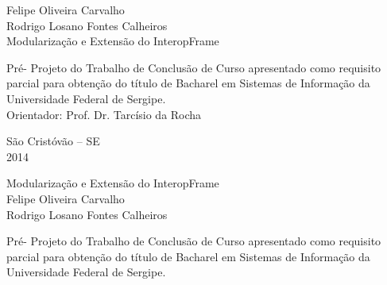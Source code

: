 \begin{titlepage}

\newpage
\thispagestyle{empty}
    \begin{center}
        {\Large Felipe Oliveira Carvalho \\ Rodrigo Losano Fontes Calheiros }\\[8.3cm]
        {\LARGE Modulariza\c{c}\~ao e Extens\~ao do InteropFrame} \\[4.3cm]
        \hspace{.45\textwidth} %
        \begin{minipage}{.5\textwidth}
            \singlespacing
                Pr\'e- Projeto do Trabalho de Conclus\~ao de Curso apresentado como requisito parcial para obten\c c\~ao do t\'itulo de Bacharel em Sistemas de Informa\c{c}\~ao da Universidade Federal de Sergipe. \\
                Orientador: Prof. Dr. Tarc\'isio da Rocha
            \onehalfspacing
        \end{minipage}
        \vfill
        {\large S\~ao Crist\'ov\~ao -- SE} \\
        {\large 2014}
    \end{center}
\pagebreak

\newpage
\thispagestyle{empty}
    \begin{center}
        {\LARGE Modulariza\c{c}\~ao e Extens\~ao do InteropFrame}\\[2.3cm]
        {\Large Felipe Oliveira Carvalho \\ Rodrigo Losano Fontes Calheiros} \\[1.5cm]
        \hspace{.45\textwidth} %
        \begin{minipage}{.5\textwidth}
            \singlespacing
                Pr\'e- Projeto do Trabalho de Conclus\~ao de Curso apresentado como requisito parcial para obten\c c\~ao do t\'itulo de Bacharel em Sistemas de Informa\c{c}\~ao da Universidade Federal de Sergipe. \\

            \onehalfspacing
        \end{minipage}\\[2.5cm]


\end{center}
\end{titlepage}
